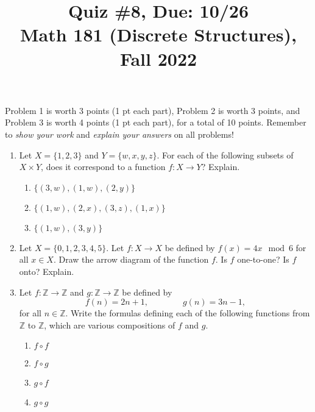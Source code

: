\documentclass[11pt]{article}
\title{Quiz \#8, Due: 10/26 \\Math 181 (Discrete Structures), Fall 2022}
\date{}
\begin{document}
\maketitle

\thispagestyle{empty}

\vspace{-1cm}

Problem 1 is worth 3 points (1 pt each part), Problem 2 is worth 3 points, and Problem 3 is worth 4 points (1 pt each part), for a total of 10 points. Remember to \emph{show your work} and \emph{explain your answers} on all problems!

\begin{enumerate}

\item Let $X=\{1,2,3\}$ and $Y=\{w,x,y,z\}$. For each of the following subsets of $X \times Y$, does it correspond to a function $f \colon X \to Y$? Explain.
\begin{enumerate}
\item $\{(3,w),(1,w),(2,y)\}$
\item $\{(1,w),(2,x),(3,z),(1,x)\}$
\item $\{(1,w),(3,y)\}$
\end{enumerate}

\item Let $X = \{0,1,2,3,4,5\}$. Let $f\colon X \to X$ be defined by $f(x) = 4x \mod 6$ for all $x \in X$. Draw the arrow diagram of the function $f$. Is $f$ one-to-one? Is $f$ onto? Explain.

\item Let $f\colon \mathbb{Z} \to \mathbb{Z}$ and $g\colon\mathbb{Z}\to \mathbb{Z}$ be defined by
\[ f(n) = 2n+1, \qquad \qquad g(n) = 3n-1,\]
for all $n \in \mathbb{Z}$. Write the formulas defining each of the following functions from $\mathbb{Z}$ to $\mathbb{Z}$, which are various compositions of $f$ and $g$.
\begin{enumerate}
\item $f \circ f$
\item $f \circ g$
\item $g \circ f$
\item $g \circ g$
\end{enumerate}

\end{enumerate}
\end{document}
